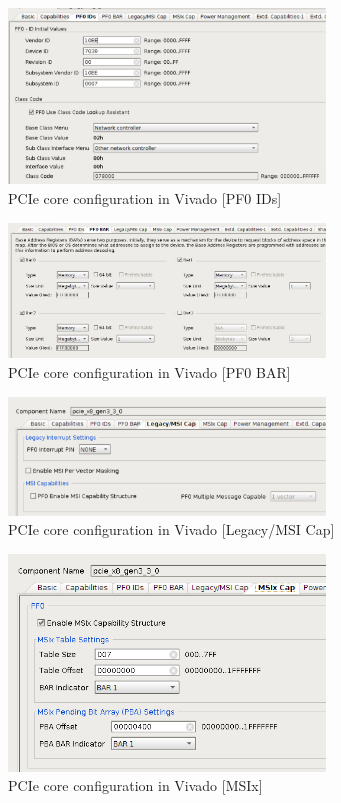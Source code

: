 \begin{figure}[H]
\centering
\includegraphics[width=0.75\textwidth]{figures/pcie_core_config3.pdf}
\caption{PCIe core configuration in Vivado [PF0 IDs]}
\label{fig:pcie_core_config3}
\end{figure}
\newpage
\begin{figure}[H]
\centering
\includegraphics[width=0.75\textwidth]{figures/pcie_core_pf0_bar.png}
\caption{PCIe core configuration in Vivado [PF0 BAR]}
\label{fig:pcie_core_config4}
\end{figure}

\begin{figure}[H]
\centering
\includegraphics[width=0.75\textwidth]{figures/pcie_core_config5.pdf}
\caption{PCIe core configuration in Vivado [Legacy/MSI Cap]}
\label{fig:pcie_core_config5}
\end{figure}

\begin{figure}[H]
\centering
\includegraphics[width=0.75\textwidth]{figures/pcie_core_msix.png}
\caption{PCIe core configuration in Vivado [MSIx]}
\label{fig:pcie_core_config6}
\end{figure}
\newpage

